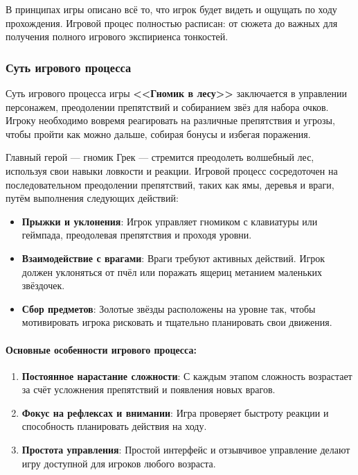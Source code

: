 \documentclass{article}
\begin{document}
В принципах игры описано всё то, что игрок будет видеть и ощущать по ходу прохождения. Игровой процес полностью расписан: от сюжета до важных для получения полного игрового экспириенса тонкостей.


\subsubsection{Суть игрового процесса}

Суть игрового процесса игры \textbf{<<Гномик в лесу>>} заключается в управлении персонажем, преодолении препятствий и собиранием звёз для набора очков. Игроку необходимо вовремя реагировать на различные препятствия и угрозы, чтобы пройти как можно дальше, собирая бонусы и избегая поражения.

Главный герой --- гномик Грек --- стремится преодолеть волшебный лес, используя свои навыки ловкости и реакции. Игровой процесс сосредоточен на последовательном преодолении препятствий, таких как ямы, деревья и враги, путём выполнения следующих действий:
\begin{itemize}
    \item \textbf{Прыжки и уклонения}: Игрок управляет гномиком с клавиатуры или геймпада, преодолевая препятствия и проходя уровни.
    \item \textbf{Взаимодействие с врагами}: Враги требуют активных действий. Игрок должен уклоняться от пчёл или поражать ящериц метанием маленьких звёздочек.
    \item \textbf{Сбор предметов}: Золотые звёзды расположены на уровне так, чтобы мотивировать игрока рисковать и тщательно планировать свои движения.
\end{itemize}

\paragraph{Основные особенности игрового процесса:}
\begin{enumerate}
    \item \textbf{Постоянное нарастание сложности}: С каждым этапом сложность возрастает за счёт  усложнения препятствий и появления новых врагов.
    \item \textbf{Фокус на рефлексах и внимании}: Игра проверяет быстроту реакции и способность планировать действия на ходу.
    \item \textbf{Простота управления}: Простой интерфейс и отзывчивое управление делают игру доступной для игроков любого возраста.
\end{enumerate}
\end{document}
